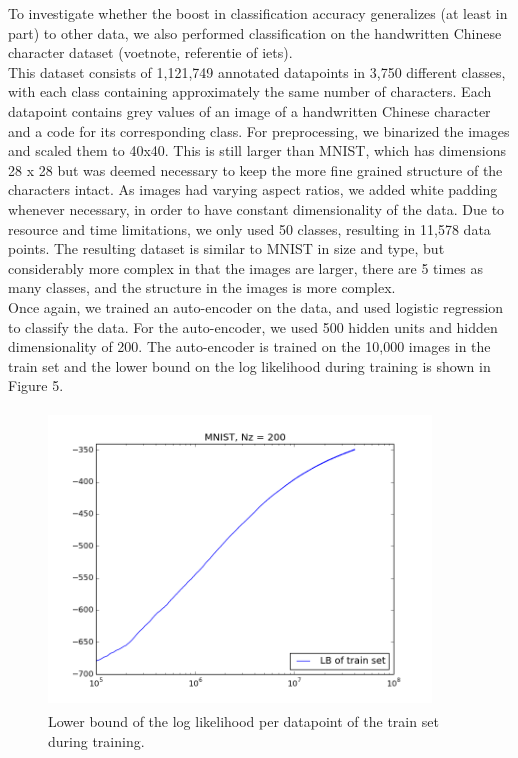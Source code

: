 \documentclass{article}
\begin{document}
To investigate whether the boost in classification accuracy generalizes (at least in part) to other data, we also performed classification on the handwritten Chinese character dataset (voetnote, referentie of iets). \\
This dataset consists of 1,121,749 annotated datapoints in 3,750 different classes, with each class containing approximately the same number of characters. Each datapoint contains grey values of an image of a handwritten Chinese character and a code for its corresponding class. For preprocessing, we binarized the images and scaled them to 40x40. This is still larger than MNIST, which has dimensions 28 x 28 but was deemed necessary to keep the more fine grained structure of the characters intact. As images had varying aspect ratios, we added white padding whenever necessary, in order to have constant dimensionality of the data. Due to resource and time limitations, we only used 50 classes, resulting in 11,578 data points. The resulting dataset is similar to MNIST in size and type, but considerably more complex in that the images are larger, there are 5 times as many classes, and the structure in the images is more complex.\\
Once again, we trained an auto-encoder on the data, and used logistic regression to classify the data. For the auto-encoder, we used 500 hidden units and hidden dimensionality of 200. The auto-encoder is trained on the 10,000 images in the train set and the lower bound on the log likelihood during training is shown in Figure 5. 

\begin{figure}[htb]
\begin{center}
\includegraphics[height=3.1in,width=4in]{lowerboundchinese.png}
\caption{Lower bound of the log likelihood per datapoint of the train set during training.}
\end{center}
\end{figure}
\end{document}

